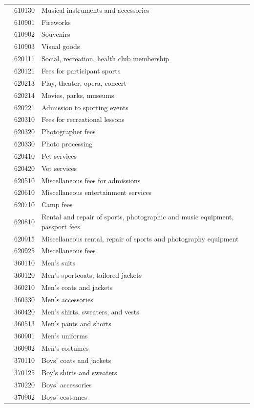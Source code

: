 \documentclass[
]{agujournal2019}
\begin{document}
\begin{table}
{\begin{tabular*}{\linewidth}{@{\extracolsep{\fill}}l|rl}
 & 610130 & Musical instruments and accessories \\ 
 & 610901 & Fireworks \\ 
 & 610902 & Souvenirs \\ 
 & 610903 & Visual goods \\ 
 & 620111 & Social, recreation, health club membership \\ 
 & 620121 & Fees for participant sports \\ 
 & 620213 & Play, theater, opera, concert \\ 
 & 620214 & Movies, parks, museums \\ 
 & 620221 & Admission to sporting events \\ 
 & 620310 & Fees for recreational lessons \\ 
 & 620320 & Photographer fees \\ 
 & 620330 & Photo processing \\ 
 & 620410 & Pet services \\ 
 & 620420 & Vet services \\ 
 & 620510 & Miscellaneous fees for admissions \\ 
 & 620610 & Miscellaneous entertainment services \\ 
 & 620710 & Camp fees \\ 
 & 620810 & Rental and repair of sports, photographic and music equipment, passport fees \\ 
 & 620915 & Miscellaneous rental, repair of sports and photography equipment \\ 
 & 620925 & Miscellaneous fees \\ 
\midrule\addlinespace[2.5pt]
\multirow[t]{84}{*}{Mandatory} & 360110 & Men's suits \\ 
 & 360120 & Men's sportcoats, tailored jackets \\ 
 & 360210 & Men's coats and jackets \\ 
 & 360330 & Men's accessories \\ 
 & 360420 & Men's shirts, sweaters, and vests \\ 
 & 360513 & Men's pants and shorts \\ 
 & 360901 & Men's uniforms \\ 
 & 360902 & Men's costumes \\ 
 & 370110 & Boys' coats and jackets \\ 
 & 370125 & Boy's shirts and sweaters \\ 
 & 370220 & Boys' accessories \\ 
 & 370902 & Boys' costumes \\ 

\end{tabular*}}
\end{table}
\end{document}
